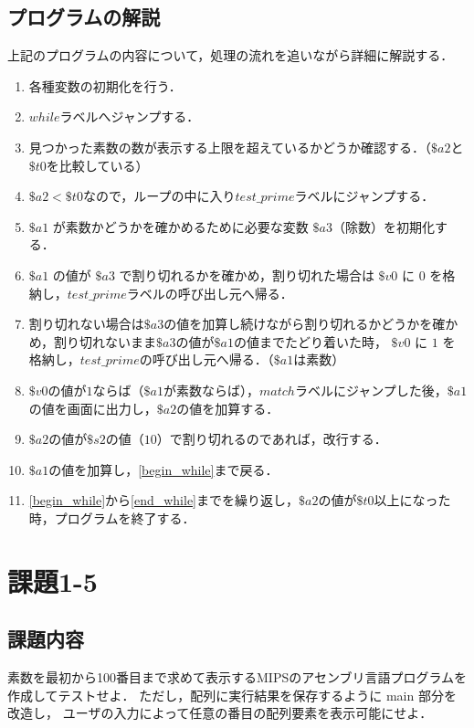 \documentclass[a4j,11pt]{jarticle}
\begin{document}
\subsection{プログラムの解説}
上記のプログラムの内容について，処理の流れを追いながら詳細に解説する．

\begin{enumerate}
      \item 各種変数の初期化を行う．
      \item $while$ラベルへジャンプする．
      \item \label{begin_while}見つかった素数の数が表示する上限を超えているかどうか確認する．（$\$a2$と$\$t0$を比較している）
      \item $\$a2 < \$t0$なので，ループの中に入り$test\_prime$ラベルにジャンプする．
      \item $\$a1$ が素数かどうかを確かめるために必要な変数 $\$a3$（除数）を初期化する．
      \item $\$a1$ の値が $\$a3$ で割り切れるかを確かめ，割り切れた場合は $\$v0$ に $0$ を格納し，$test\_prime$ラベルの呼び出し元へ帰る．
      \item 割り切れない場合は$\$a3$の値を加算し続けながら割り切れるかどうかを確かめ，割り切れないまま$\$a3$の値が$\$a1$の値までたどり着いた時，
      $\$v0$ に $1$ を格納し，$test\_prime$の呼び出し元へ帰る．（$\$a1$は素数）
      \item $\$v0$の値が$1$ならば（$\$a1$が素数ならば），$match$ラベルにジャンプした後，$\$a1$の値を画面に出力し，$\$a2$の値を加算する．
      \item $\$a2$の値が$\$s2$の値（$10$）で割り切れるのであれば，改行する．
      \item \label{end_while}$\$a1$の値を加算し，\ref{begin_while}まで戻る．
      \item \ref{begin_while}から\ref{end_while}までを繰り返し，$\$a2$の値が$\$t0$以上になった時，プログラムを終了する．
\end{enumerate}
\section{課題1-5}

\subsection{課題内容}

素数を最初から100番目まで求めて表示するMIPSのアセンブリ言語プログラムを作成してテストせよ． 
ただし，配列に実行結果を保存するように main 部分を改造し， 
ユーザの入力によって任意の番目の配列要素を表示可能にせよ．
\end{document}
